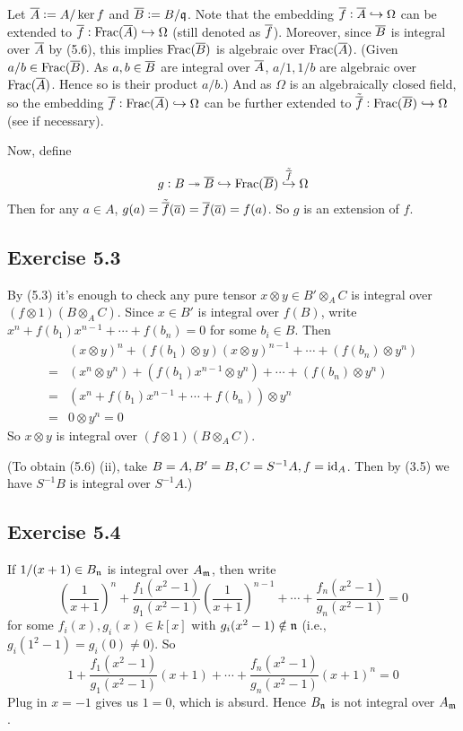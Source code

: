 \documentclass[../A&M.tex]{subfiles}
\begin{document}
Let $\overline{A}:=A/\ker f$ and $\overline{B}:=B/\mathfrak{q}$. Note that the embedding $\overline{f}: \overline{A} \hookrightarrow \Omega$ can be extended to $\overline{f}: \operatorname{Frac}(\overline{A}) \hookrightarrow \Omega$ (still denoted as $\overline{f}$). Moreover, since $\overline{B}$ is integral over $\overline{A}$ by (5.6), this implies $\operatorname{Frac}(\overline{B})$ is algebraic over $\operatorname{Frac}(\overline{A})$. (Given $a/b \in \operatorname{Frac}(\overline{B})$. As $a,b\in\overline{B}$ are integral over $\overline{A}$, $a/1,1/b$ are algebraic over $\operatorname{Frac}(\overline{A})$. Hence so is their product $a/b$.) And as $\Omega$ is an algebraically closed field, so the embedding $\overline{f}: \operatorname{Frac}(\overline{A}) \hookrightarrow \Omega$ can be further extended to $\tilde{\overline{f}}: \operatorname{Frac}(\overline{B}) \hookrightarrow \Omega$ (see  if necessary).

Now, define
$$
g: B \twoheadrightarrow \overline{B} \hookrightarrow \operatorname{Frac}(\overline{B}) \overset{\tilde{\overline{f}}}{\hookrightarrow} \Omega
$$
Then for any $a\in A$, $g(a) = \tilde{\overline{f}}(\overline{a}) = \overline{f}(\overline{a}) = f(a)$. So $g$ is an extension of $f$.

\subsection*{Exercise 5.3}

By (5.3) it's enough to check any pure tensor $x \otimes y \in B' \otimes_A C$ is integral over $(f \otimes 1)(B \otimes_A C)$. Since $x \in B'$ is integral over $f(B)$, write $x^n + f(b_1)x^{n-1} + \cdots + f(b_n) = 0$ for some $b_i \in B$. Then
\begin{align*}
&(x \otimes y)^n + (f(b_1) \otimes y)(x \otimes y)^{n-1} + \cdots + (f(b_n) \otimes y^n)    \\
={} &(x^n \otimes y^n) + (f(b_1)x^{n-1} \otimes y^n) + \cdots + (f(b_n) \otimes y^n)  \\
={} &(x^n + f(b_1)x^{n-1} + \cdots + f(b_n)) \otimes y^n   \\
={} &0 \otimes y^n = 0
\end{align*}
So $x \otimes y$ is integral over $(f \otimes 1)(B \otimes_A C)$.

(To obtain (5.6) (ii), take $B=A, B'=B, C=S^{-1}A, f=\operatorname{id}_A$. Then by (3.5) we have $S^{-1}B$ is integral over $S^{-1}A$.)

\subsection*{Exercise 5.4}

If $1/(x+1) \in B_{\mathfrak{n}}$ is integral over $A_{\mathfrak{m}}$, then write
$$
\left( \frac{1}{x+1} \right)^n + \frac{f_1(x^2-1)}{g_1(x^2-1)} \left( \frac{1}{x+1} \right)^{n-1} + \cdots + \frac{f_n(x^2-1)}{g_n(x^2-1)} = 0
$$
for some $f_i(x),g_i(x) \in k[x]$ with $g_i(x^2-1) \notin \mathfrak{n}$ (i.e., $g_i(1^2-1) = g_i(0) \neq 0$). So
$$
1 + \frac{f_1(x^2-1)}{g_1(x^2-1)} (x+1) + \cdots + \frac{f_n(x^2-1)}{g_n(x^2-1)} (x+1)^n = 0
$$
Plug in $x=-1$ gives us $1=0$, which is absurd. Hence $B_{\mathfrak{n}}$ is not integral over $A_{\mathfrak{m}}$.
\end{document}
